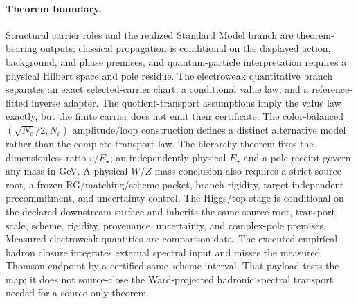 \paragraph{Theorem boundary.}
Structural carrier roles and the realized Standard Model branch are theorem-bearing outputs;
classical propagation is conditional on the displayed action, background, and
phase premises, and quantum-particle interpretation requires a physical
Hilbert space and pole residue.
The electroweak quantitative branch separates an exact selected-carrier chart, a conditional value
law, and a reference-fitted inverse adapter. The quotient-transport assumptions imply the value law
exactly, but the finite carrier does not emit their certificate. The color-balanced
\((\sqrt{N_c}/2,N_c)\) amplitude/loop construction defines a distinct alternative model rather
than the complete transport law. The hierarchy theorem fixes the dimensionless
ratio \(v/E_\star\); an independently physical \(E_\star\) and a pole receipt govern any mass in
GeV. A physical \(W/Z\) mass conclusion also requires a strict source root, a frozen
RG/matching/scheme packet, branch rigidity, target-independent precommitment, and uncertainty control. The
Higgs/top stage is conditional on the declared downstream surface and inherits the same
source-root, transport, scale, scheme, rigidity, provenance, uncertainty, and complex-pole premises.
Measured electroweak quantities are comparison data. The executed empirical hadron closure
integrates external spectral input and misses the measured Thomson endpoint by a certified
same-scheme interval. That payload tests the map; it does not source-close the Ward-projected
hadronic spectral transport needed for a source-only theorem.

